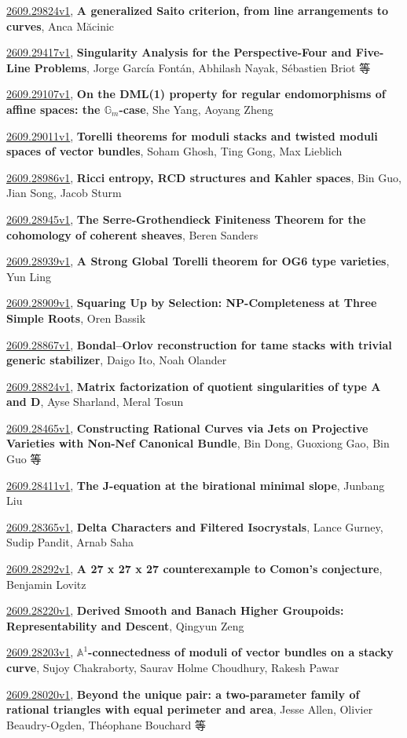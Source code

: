 \documentclass[9pt, a4paper]{article}
\theoremstyle{plain}
\theoremstyle{definition}
\theoremstyle{remark}
\newcommand{\arxiv}[3]{\href{https://arxiv.org/abs/#1}{#1}, \textbf{\textcolor{arxivblue}{#2}}, #3}
\begin{document}
\arxiv{2609.29824v1}{A generalized Saito criterion, from line arrangements to curves}{Anca Măcinic}

\arxiv{2609.29417v1}{Singularity Analysis for the Perspective-Four and Five-Line Problems}{Jorge García Fontán, Abhilash Nayak, Sébastien Briot 等}

\arxiv{2609.29107v1}{On the DML(1) property for regular endomorphisms of affine spaces: the $\mathbb{G}_m$-case}{She Yang, Aoyang Zheng}

\arxiv{2609.29011v1}{Torelli theorems for moduli stacks and twisted moduli spaces of vector bundles}{Soham Ghosh, Ting Gong, Max Lieblich}

\arxiv{2609.28986v1}{Ricci entropy, RCD structures and Kahler spaces}{Bin Guo, Jian Song, Jacob Sturm}

\arxiv{2609.28945v1}{The Serre-Grothendieck Finiteness Theorem for the cohomology of coherent sheaves}{Beren Sanders}

\arxiv{2609.28939v1}{A Strong Global Torelli theorem for OG6 type varieties}{Yun Ling}

\arxiv{2609.28909v1}{Squaring Up by Selection: NP-Completeness at Three Simple Roots}{Oren Bassik}

\arxiv{2609.28867v1}{Bondal--Orlov reconstruction for tame stacks with trivial generic stabilizer}{Daigo Ito, Noah Olander}

\arxiv{2609.28824v1}{Matrix factorization of quotient singularities of type A and D}{Ayse Sharland, Meral Tosun}

\arxiv{2609.28465v1}{Constructing Rational Curves via Jets on Projective Varieties with Non-Nef Canonical Bundle}{Bin Dong, Guoxiong Gao, Bin Guo 等}

\arxiv{2609.28411v1}{The J-equation at the birational minimal slope}{Junbang Liu}

\arxiv{2609.28365v1}{Delta Characters and Filtered Isocrystals}{Lance Gurney, Sudip Pandit, Arnab Saha}

\arxiv{2609.28292v1}{A 27 x 27 x 27 counterexample to Comon's conjecture}{Benjamin Lovitz}

\arxiv{2609.28220v1}{Derived Smooth and Banach Higher Groupoids: Representability and Descent}{Qingyun Zeng}

\arxiv{2609.28203v1}{$\mathbb{A}^1$-connectedness of moduli of vector bundles on a stacky curve}{Sujoy Chakraborty, Saurav Holme Choudhury, Rakesh Pawar}

\arxiv{2609.28020v1}{Beyond the unique pair: a two-parameter family of rational triangles with equal perimeter and area}{Jesse Allen, Olivier Beaudry-Ogden, Théophane Bouchard 等}
\end{document}

